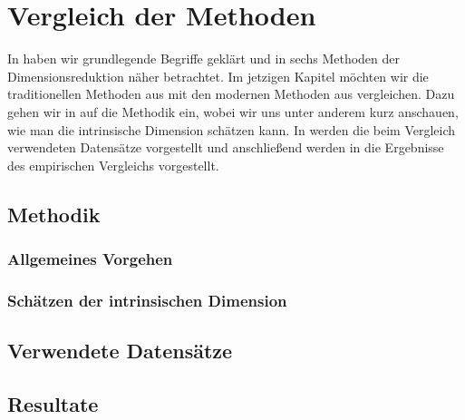 \chapter{Vergleich der Methoden}
\label{ch:Vergleich}

In  haben wir grundlegende Begriffe geklärt und in
 sechs Methoden der Dimensionsreduktion näher betrachtet. Im jetzigen
Kapitel möchten wir die traditionellen Methoden aus  mit
den modernen Methoden aus  vergleichen. Dazu gehen wir in
 auf die Methodik ein, wobei wir uns unter anderem kurz
anschauen, wie man die intrinsische Dimension schätzen kann. In
 werden die beim Vergleich verwendeten Datensätze
vorgestellt und anschließend werden in  die Ergebnisse des
empirischen Vergleichs vorgestellt.

\section{Methodik}
\label{ch:Vergleich:sec:Methodik}

\subsection{Allgemeines Vorgehen}
\label{ch:Vergleich:sec:Methodik:subsec:AllgemeinesVorgehen}



\subsection{Schätzen der intrinsischen Dimension}
\label{ch:Vergleich:sec:Methodik:subsec:SchaetzenDerIntrinsischenDim}

\section{Verwendete Datensätze}
\label{ch:Vergleich:sec:VerwendeteDatensaetze}

\section{Resultate}
\label{ch:Vergleich:sec:Resultate}
